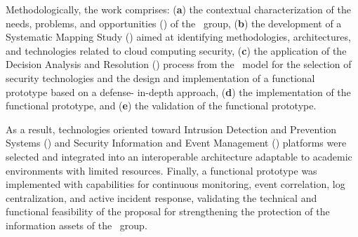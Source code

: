 Methodologically, the work comprises: (\textbf{a}) the contextual characterization of the needs, problems, and opportunities (\NPO) of the 
\GRID\ group, (\textbf{b}) the development of a Systematic Mapping Study (\SMS) aimed at identifying methodologies, architectures, and 
technologies related to cloud computing security, (\textbf{c}) the application of the Decision Analysis and Resolution (\DAR) process from 
the \CMMI\ model for the selection of security technologies and the design and implementation of a functional prototype based on a defense-
in-depth approach, (\textbf{d}) the implementation of the functional prototype, and (\textbf{e}) the validation of the functional prototype.

As a result, technologies oriented toward Intrusion Detection and Prevention Systems (\IDPS) and Security Information and Event Management 
(\SIEM) platforms were selected and integrated into an interoperable architecture adaptable to academic environments with limited resources. 
Finally, a functional prototype was implemented with capabilities for continuous monitoring, event correlation, log centralization, and 
active incident response, validating the technical and functional feasibility of the proposal for strengthening the protection of the 
information assets of the \GRID\ group.
